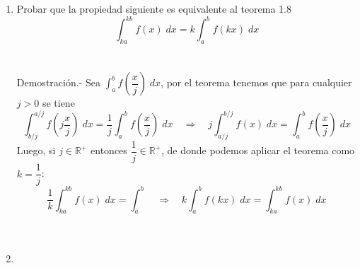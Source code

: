 \begin{enumerate}
    \item Probar que la propiedad siguiente es equivalente al teorema 1.8 $$\displaystyle\int_{ka}^{kb} f(x) \; dx = k \int_{a}^{b} f(kx) \; dx$$\\\\
	Demostración.-\; Sea $\displaystyle\int_{a}^{b} f\left(\dfrac{x}{j}\right) \; dx$, por el teorema tenemos que para cualquier $j>0$ se tiene $$\displaystyle\int_{b/j}^{a/j}f\left(j\dfrac{x}{j}\right)\; dx = \dfrac{1}{j} \int_{a}^{b} f \left(\dfrac{x}{j}\right) \; dx \quad \Rightarrow \quad j\int_{a/j}^{b/j} f(x) \; dx = \int_{a}^{b} f\left(\dfrac{x}{j} \right) \; dx$$ Luego, si $j \in \mathbb{R}^+$ entonces $\dfrac{1}{j}\in \mathbb{R}^+$, de donde podemos aplicar el teorema como $k=\dfrac{1}{j}$: $$\dfrac{1}{k}\displaystyle\int_{ka}^{kb} f(x)\; dx = \int_{a}^{b} \quad \Rightarrow \quad k \int_{a}^{b} f(kx) \; dx = \int_{ka}^{kb} f(x) \; dx$$\\\\

    \item 

\end{enumerate}
